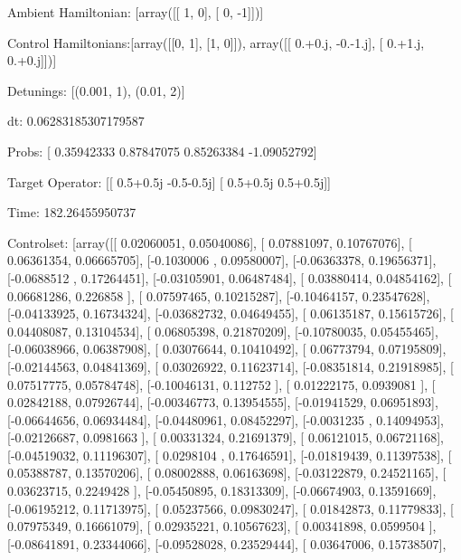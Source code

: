 \documentclass{article}
\begin{document}
    

\newpage

Ambient Hamiltonian: [array([[ 1,  0],
       [ 0, -1]])]

Control Hamiltonians:[array([[0, 1],
       [1, 0]]), array([[ 0.+0.j, -0.-1.j],
       [ 0.+1.j,  0.+0.j]])]

Detunings: [(0.001, 1), (0.01, 2)]

 dt: 0.06283185307179587

Probs: [ 0.35942333  0.87847075  0.85263384 -1.09052792]

Target Operator: [[ 0.5+0.5j -0.5-0.5j]
 [ 0.5+0.5j  0.5+0.5j]]

Time: 182.26455950737

Controlset: [array([[ 0.02060051,  0.05040086],
       [ 0.07881097,  0.10767076],
       [ 0.06361354,  0.06665705],
       [-0.1030006 ,  0.09580007],
       [-0.06363378,  0.19656371],
       [-0.0688512 ,  0.17264451],
       [-0.03105901,  0.06487484],
       [ 0.03880414,  0.04854162],
       [ 0.06681286,  0.226858  ],
       [ 0.07597465,  0.10215287],
       [-0.10464157,  0.23547628],
       [-0.04133925,  0.16734324],
       [-0.03682732,  0.04649455],
       [ 0.06135187,  0.15615726],
       [ 0.04408087,  0.13104534],
       [ 0.06805398,  0.21870209],
       [-0.10780035,  0.05455465],
       [-0.06038966,  0.06387908],
       [ 0.03076644,  0.10410492],
       [ 0.06773794,  0.07195809],
       [-0.02144563,  0.04841369],
       [ 0.03026922,  0.11623714],
       [-0.08351814,  0.21918985],
       [ 0.07517775,  0.05784748],
       [-0.10046131,  0.112752  ],
       [ 0.01222175,  0.0939081 ],
       [ 0.02842188,  0.07926744],
       [-0.00346773,  0.13954555],
       [-0.01941529,  0.06951893],
       [-0.06644656,  0.06934484],
       [-0.04480961,  0.08452297],
       [-0.0031235 ,  0.14094953],
       [-0.02126687,  0.0981663 ],
       [ 0.00331324,  0.21691379],
       [ 0.06121015,  0.06721168],
       [-0.04519032,  0.11196307],
       [ 0.0298104 ,  0.17646591],
       [-0.01819439,  0.11397538],
       [ 0.05388787,  0.13570206],
       [ 0.08002888,  0.06163698],
       [-0.03122879,  0.24521165],
       [ 0.03623715,  0.2249428 ],
       [-0.05450895,  0.18313309],
       [-0.06674903,  0.13591669],
       [-0.06195212,  0.11713975],
       [ 0.05237566,  0.09830247],
       [ 0.01842873,  0.11779833],
       [ 0.07975349,  0.16661079],
       [ 0.02935221,  0.10567623],
       [ 0.00341898,  0.0599504 ],
       [-0.08641891,  0.23344066],
       [-0.09528028,  0.23529444],
       [ 0.03647006,  0.15738507],
\end{document}

